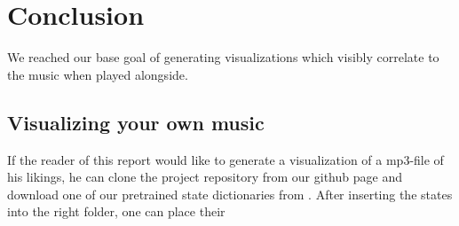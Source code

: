 \chapter{Conclusion}
    We reached our base goal of generating visualizations which visibly correlate to the music when played alongside.

    \section{Visualizing your own music}
    If the reader of this report would like to generate a visualization of a mp3-file of his likings, he can clone the project repository from our github page and download one of our pretrained state dictionaries from . After inserting the states into the right folder, one can place their 